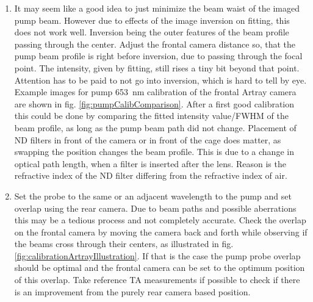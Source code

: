 \documentclass[twoside,openright,listof=numbered]{scrreprt}
\begin{document}
\begin{enumerate}
\item It may seem like a good idea to just minimize the beam waist of the imaged pump beam. However due to effects of the image inversion on fitting, this does not work well. Inversion being the outer features of the beam profile passing through the center. Adjust the frontal camera distance so, that the pump beam profile is right before inversion, due to passing through the focal point. The intensity, given by fitting, still rises a tiny bit beyond that point. Attention has to be paid to not go into inversion, which is hard to tell by eye. Example images for pump \qty{653}{\nano\meter} calibration of the frontal Artray camera are shown in fig. \ref{fig:pumpCalibComparison}. After a first good calibration this could be done by comparing the fitted intensity value/FWHM of the beam profile, as long as the pump beam path did not change. Placement of ND filters in front of the camera or in front of the cage does matter, as swapping the position changes the beam profile. This is due to a change in optical path length, when a filter is inserted after the lens. Reason is the refractive index of the ND filter differing from the refractive index of air.
\item Set the probe to the same or an adjacent wavelength to the pump and set overlap using the rear camera. Due to beam paths and possible aberrations this may be a tedious process and not completely accurate. Check the overlap on the frontal camera by moving the camera back and forth while observing if the beams cross through their centers, as illustrated in fig. \ref{fig:calibrationArtrayIllustration}. If that is the case the pump probe overlap should be optimal and the frontal camera can be set to the optimum position of this overlap. Take reference TA measurements if possible to check if there is an improvement from the purely rear camera based position.
\end{enumerate}
\end{document}
